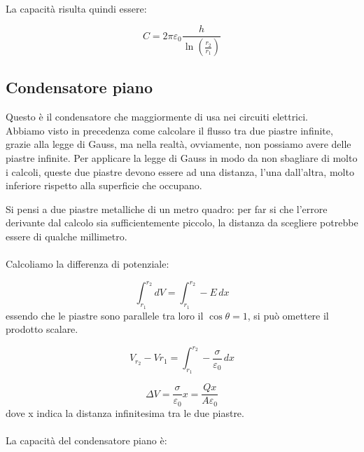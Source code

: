 \paragraph{}
La capacità risulta quindi essere:

\begin{equation}
    C = 2\pi\varepsilon_0\frac{h}{\ln(\frac{r_2}{r_1})}
\end{equation}


\subsection{Condensatore piano}
Questo è il condensatore che maggiormente di usa nei circuiti elettrici.\\
Abbiamo visto in precedenza come calcolare il flusso tra due piastre infinite, grazie alla legge di Gauss, ma nella realtà, ovviamente, non possiamo avere delle piastre infinite. Per applicare la legge di Gauss in modo da non sbagliare di molto i calcoli, queste due piastre devono essere ad una distanza, l'una dall'altra, molto inferiore rispetto alla superficie che occupano.

Si pensi a due piastre metalliche di un metro quadro: per far si che l'errore derivante dal calcolo sia sufficientemente piccolo, la distanza da scegliere potrebbe essere di qualche millimetro.

\paragraph{}
Calcoliamo la differenza di potenziale:

\begin{equation*}
    \int_{r_1}^{r_2} dV = \int_{r_1}^{r_2} - E\,dx
\end{equation*}
essendo che le piastre sono parallele tra loro il $\cos\theta = 1$, si può omettere il prodotto scalare.

\begin{equation*}
    V_{r_2} - V{r_1} = \int_{r_1}^{r_2} - \frac{\sigma}{\varepsilon_0}\,dx
\end{equation*}

\begin{equation}
    \Delta V  =  \frac{\sigma}{\varepsilon_0}x = \frac{Qx}{A \varepsilon_0}
\end{equation}
dove x indica la distanza infinitesima tra le due piastre.

\paragraph{}
La capacità del condensatore piano è:

